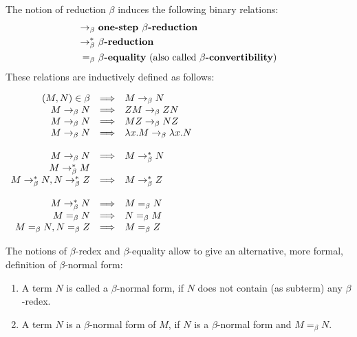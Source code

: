 \begin{definition} The notion of reduction $\beta$ induces the following binary relations:
\begin{align*}
\rightarrow_\beta \  & \textbf{one-step } \beta \textbf{-reduction} \\
\rightarrow^{*}_\beta \  &  \beta \textbf{-reduction} \\
=_{\beta} \  & \beta \textbf{-equality} \text{ (also called } \beta \textbf{-convertibility}\text{)} 
\end{align*}
These relations are inductively defined as follows:
\begin{center}
$
\begin{array}{rcl}
(M,N) \in \beta & \Longrightarrow & M \rightarrow_\beta N \\
M \rightarrow_\beta N &  \Longrightarrow & ZM \rightarrow_\beta ZN \\ 
M \rightarrow_\beta N &  \Longrightarrow & MZ \rightarrow_\beta NZ \\ 
M \rightarrow_\beta N & \Longrightarrow & \lambda x.M \rightarrow_\beta \lambda x.N \\
& & \\
M \rightarrow_\beta N &  \Longrightarrow & M \rightarrow^{*}_\beta N \\ 
M \rightarrow^{*}_\beta M & \\ 
M \rightarrow^{*}_\beta N, N \rightarrow^{*}_\beta Z & \Longrightarrow & M \rightarrow^{*}_\beta Z \\
&& \\
M \rightarrow^{*}_\beta N &  \Longrightarrow & M =_{\beta} N \\ 
M =_{\beta} N & \Longrightarrow & N =_{\beta} M\\ 
M =_{\beta} N, N =_{\beta} Z & \Longrightarrow & M =_{\beta} Z 
\end{array} 
$
\end{center}



\end{definition}

The notions of $\beta$-redex and $\beta$-equality allow to give an alternative, more formal, definition of $\beta$-normal form:
\begin{definition}  
\begin{enumerate}
\item A term $N$ is called a $\beta$-normal form, if $N$ does not contain (as subterm) any $\beta$-redex.
\item A term $N$ is a $\beta$-normal form of $M$, if $N$ is a $\beta$-normal form and $M =_{\beta} N$.
\end{enumerate}
\end{definition}

